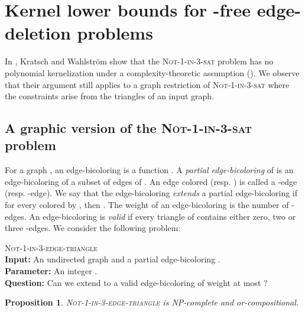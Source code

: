 \documentclass[11pt]{article}
\newtheorem{proposition}[lemma]{Proposition}
\newcommand{\gbc}{\textsc{Not-1-in-3-edge-triangle}}
\begin{document}
\section{Kernel lower bounds for -free edge-deletion problems}
\label{sec:lower}

\newcommand{\notone}{\textsc{Not-1-in-3-sat}}

In \cite{KW09}, Kratsch and Wahlstr\"om show that the \notone{} problem has no polynomial kernelization under a complexity-theoretic assumption ().
We observe that their argument still applies to a graph restriction of \notone{} where the constraints arise from the triangles of an input graph. 

\subsection{A graphic version of the {\sc\notone{}} problem}


For a graph , an edge-bicoloring is a function . A \emph{partial edge-bicoloring} of  is an edge-bicoloring of a subset of edges of . An edge colored  (resp. ) is called a -edge (resp. -edge). We say that the edge-bicoloring  \emph{extends} a partial edge-bicoloring  if for every  colored by , then .
The weight of an edge-bicoloring is the number  of -edges. An edge-bicoloring is \emph{valid} if  every triangle of  contains either zero, two or three -edges. We consider the following problem:

\medskip
\noindent
\textsc{Not-1-in-3-edge-triangle}\\
\textbf{Input:} An undirected graph  and a partial edge-bicoloring .\\
\textbf{Parameter:} An integer .\\
\textbf{Question:} Can we extend  to a valid edge-bicoloring  of weight at most ?

\begin{proposition} \label{prop1} 
 \gbc{} is NP-complete and or-compositional.
\end{proposition}
\end{document}
